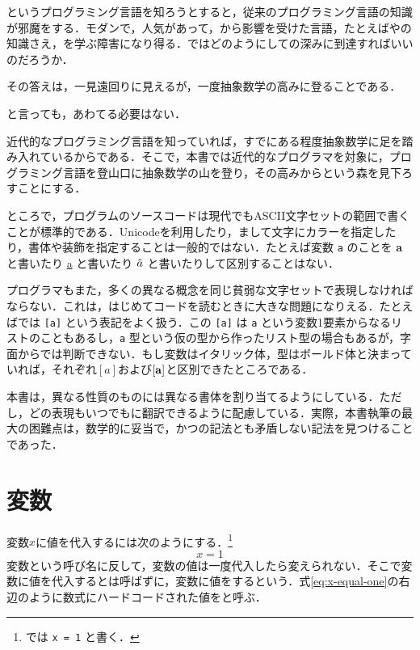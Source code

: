 \documentclass[platex,a5paper,twoside,fleqn,draft]{jsbook}
\newcommand{\keyword}[1]{\textgt{\textbf{#1}}}
\begin{document}
\haskell というプログラミング言語を知ろうとすると，従来のプログラミング言語の知識が邪魔をする．モダンで，人気があって，\haskell から影響を受けた言語，たとえば\ruby や\swift の知識さえ，\haskell を学ぶ障害になり得る．ではどのようにして\haskell の深みに到達すればいいのだろうか．

その答えは，一見遠回りに見えるが，一度抽象数学の高みに登ることである．

と言っても，あわてる必要はない．

近代的なプログラミング言語を知っていれば，すでにある程度抽象数学に足を踏み入れているからである．そこで，本書では近代的なプログラマを対象に，プログラミング言語を登山口に抽象数学の山を登り，その高みから\haskell という森を見下ろすことにする．

ところで，プログラムのソースコードは現代でもASCII文字セットの範囲で書くことが標準的である．Unicodeを利用したり，まして文字にカラーを指定したり，書体や装飾を指定することは一般的ではない．たとえば変数 \verb|a| のことを \textbf{a} と書いたり \underline{a} と書いたり $\Hat a$ と書いたりして区別することはない．

\haskell プログラマもまた，多くの異なる概念を同じ貧弱な文字セットで表現しなければならない．これは，はじめて\haskell コードを読むときに大きな問題になりえる．たとえば\haskell では \verb|[a]| という表記をよく扱う．この \verb|[a]| は \verb|a| という変数1要素からなるリストのこともあるし，\verb|a| 型という仮の型から作ったリスト型の場合もあるが，字面からでは判断できない．もし変数はイタリック体，型はボールド体と決まっていれば，それぞれ$[a]$および$[\mathord{\mathbf{a}}]$と区別できたところである．

本書は，異なる性質のものには異なる書体を割り当てるようにしている．ただし，どの表現もいつでも\haskell に翻訳できるように配慮している．実際，本書執筆の最大の困難点は，数学的に妥当で，かつ\haskell の記法とも矛盾しない記法を見つけることであった．

\section{変数}

変数$x$に値を代入するには次のようにする．\footnote{\haskell では \verb|x = 1| と書く．}
\begin{equation}
x=1
\label{eq:x-equal-one}
\end{equation}
変数という呼び名に反して，変数の値は一度代入したら変えられない．そこで変数に値を代入するとは呼ばずに，変数に値を\keyword{束縛}するという．式\eqref{eq:x-equal-one}の右辺のように数式にハードコードされた値を\keyword{リテラル}と呼ぶ．
\end{document}
